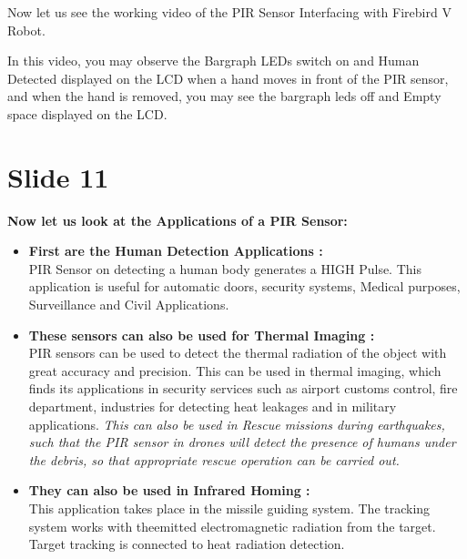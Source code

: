 \documentclass[a4paper,12 pt]{article}
\begin{document}
Now let us see the working video of the PIR Sensor Interfacing with Firebird V Robot.

In this video, you may observe the Bargraph LEDs switch on and Human Detected displayed on the LCD when a hand moves in front of the PIR sensor, and when the hand is removed,  you may see the bargraph leds off and Empty space displayed on the LCD.

\section{Slide 11}
\textbf{Now let us look at the Applications of a PIR Sensor:}
\begin{itemize}
\item \textbf{First are the Human Detection Applications : }\\
PIR Sensor on detecting a human body generates a HIGH Pulse. This application is useful for automatic doors, security systems, Medical purposes, Surveillance and Civil Applications.

\item \textbf{These sensors can also be used for Thermal Imaging :}\\
PIR sensors can be used to detect the thermal radiation of the object with great accuracy and precision. This can be used in thermal imaging, which finds its applications in security services such as airport customs control, fire department, industries for detecting heat leakages and in military applications. \textit{ This can also be used in Rescue missions during earthquakes, such that the PIR sensor in drones will detect the presence of humans under the debris, so that appropriate rescue operation can be carried out.}

\item \textbf{They can also be used in Infrared Homing :}\\
This application takes place in the missile guiding system. The tracking system works with theemitted electromagnetic radiation from the target. Target tracking is connected to heat radiation detection.
\end{itemize}
\end{document}
